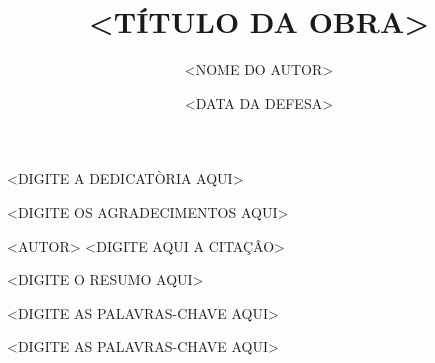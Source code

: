 \documentclass{ufpethesis}
\institute{<NOME DO INSTITUTO OU CENTRO ACADÊMICO>}
\title{<TÍTULO DA OBRA>}
\date{<DATA DA DEFESA>}
\author{<NOME DO AUTOR>}
\begin{document}
\frontmatter

\frontpage

\presentationpage

\begin{dedicatory}
<DIGITE A DEDICATÒRIA AQUI>
\end{dedicatory}

\acknowledgements
<DIGITE OS AGRADECIMENTOS AQUI>

\begin{epigraph}[<NOTA>]{<AUTOR>}
<DIGITE AQUI A CITAÇÂO>
\end{epigraph}

\resumo
<DIGITE O RESUMO AQUI>
\begin{keywords}
<DIGITE AS PALAVRAS-CHAVE AQUI>
\end{keywords}

\abstract
\begin{keywords}
<DIGITE AS PALAVRAS-CHAVE AQUI>
\end{keywords}

\tableofcontents

\listoffigures

\listoftables



\mainmatter

% 
% 
% 
\end{document}
